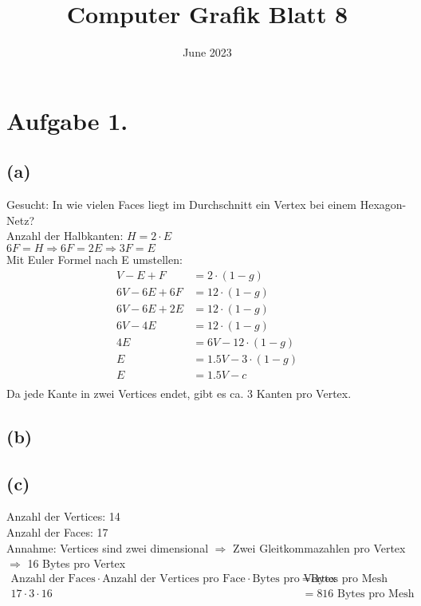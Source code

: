 \documentclass{article}
\title{Computer Grafik Blatt 8}
\date{June 2023}
\begin{document}
\maketitle

\section*{Aufgabe 1.}

\subsection*{(a)}

Gesucht: In wie vielen Faces liegt im Durchschnitt ein Vertex bei einem Hexagon-Netz? \\

Anzahl der Halbkanten: $H = 2 \cdot E$ \\
$6F = H \Rightarrow 6F = 2E \Rightarrow 3F = E$ \\

Mit Euler Formel nach E umstellen: \\
\[
    \begin{aligned}
        V - E + F &= 2 \cdot (1 - g) \\
        6V - 6E + 6F &= 12 \cdot (1 - g) \\
        6V - 6E + 2E &= 12 \cdot (1 - g) \\
        6V - 4E &= 12 \cdot (1 - g) \\
        4E &= 6V - 12 \cdot (1 - g) \\
        E &= 1.5V - 3 \cdot (1 - g) \\
        E &= 1.5V - c \\
    \end{aligned}
\]
Da jede Kante in zwei Vertices endet, gibt es ca. 3 Kanten pro Vertex. \\

\subsection*{(b)}

\subsection*{(c)}
Anzahl der Vertices: 14 \\
Anzahl der Faces: 17 \\

Annahme: Vertices sind zwei dimensional $\Rightarrow$ Zwei Gleitkommazahlen pro Vertex $\Rightarrow$ 16 Bytes pro Vertex \\
\[
    \begin{aligned}
        \text{Anzahl der Faces} \cdot \text{Anzahl der Vertices pro Face} \cdot \text{Bytes pro Vertex} &= \text{Bytes pro Mesh} \\    
        17 \cdot 3 \cdot 16 &= 816 \text{ Bytes pro Mesh} \\
    \end{aligned}
\]
\end{document}
